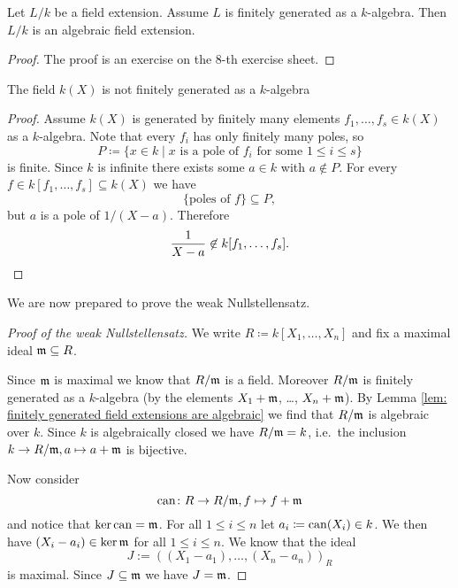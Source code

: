 \begin{lem}\label{lem: finitely generated field extensions are algebraic}
  Let $L/k$ be a field extension. Assume $L$ is finitely generated as a $k$-algebra. Then $L/k$ is an algebraic field extension.
\end{lem}
\begin{proof}
  The proof is an exercise on the $8$-th exercise sheet.
\end{proof}


\begin{rem}
  The field $k(X)$ is not finitely generated as a $k$-algebra
  \begin{proof}
    Assume $k(X)$ is generated by finitely many elements $f_1, \dotsc, f_s \in k(X)$ as a $k$-algebra. Note that every $f_i$ has only finitely many poles, so
    \[
      P \coloneqq \{x \in k \mid \text{$x$ is a pole of $f_i$ for some $1 \leq i \leq s$}\}
    \]
    is finite. Since $k$ is infinite there exists some $a \in k$ with $a \not\in P$. For every $f \in k[f_1, \dotsc, f_s] \subseteq k(X)$ we have
    \[
      \{\text{poles of $f$}\} \subseteq P,
    \]
      but $a$ is a pole of $1/(X-a)$. Therefore
    \[
      \frac{1}{X-a} \not\in k[f_1, \dotsc, f_s].
      \qedhere
    \]
  \end{proof}
\end{rem}


We are now prepared to prove the weak Nullstellensatz.


\begin{proof}[Proof of the weak Nullstellensatz]
  We write $R \coloneqq k[X_1, \dotsc, X_n]$ and fix a maximal ideal $\mathfrak{m} \subseteq R$.
  
  Since $\mathfrak{m}$ is maximal we know that $R/\mathfrak{m}$ is a field. Moreover $R/\mathfrak{m}$ is finitely generated as a $k$-algebra (by the elements $X_1 + \mathfrak{m}$, \dots, $X_n + \mathfrak{m}$). By Lemma \ref{lem: finitely generated field extensions are algebraic} we find that $R/\mathfrak{m}$ is algebraic over $k$. Since $k$ is algebraically closed we have 
  $R/\mathfrak{m} = k$, i.e.\ the inclusion $k \to R/\mathfrak{m}, a \mapsto a+\mathfrak{m}$ is bijective.
  
  Now consider
  \[
    \operatorname{can} \colon R \to R/\mathfrak{m}, f \mapsto f + \mathfrak{m}
  \]
  and notice that $\ker \operatorname{can} = \mathfrak{m}$. For all $1 \leq i \leq n$ let $a_i \coloneqq \operatorname{can}(X_i) \in k$. We then have $(X_i - a_i) \in \ker \mathfrak{m}$ for all $1 \leq i \leq n$. We know that the ideal
  \[
    J := ((X_1 - a_1), \dotsc, (X_n - a_n))_R
  \]
  is maximal. Since $J \subseteq \mathfrak{m}$ we have $J = \mathfrak{m}$.
\end{proof}


